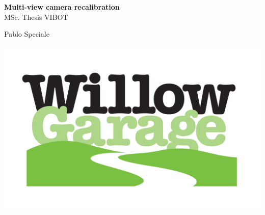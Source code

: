 
\newpage
\thispagestyle{empty}


\vspace*{1cm}
\begin{center}
\huge{\bf Multi-view camera recalibration} \\[0.5cm]
{\Large MSc. Thesis VIBOT\\} \vspace{2cm} {\large
Pablo Speciale\\
\vspace{1cm}

\includegraphics[height=0.20\textheight]{images/WG_logo_on_white.jpg}
}
\end{center}

